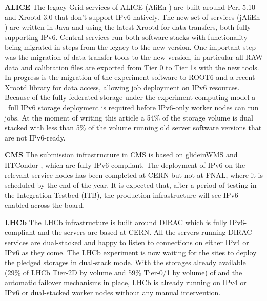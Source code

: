 \textbf{ALICE}
The legacy Grid services of ALICE (AliEn \cite{alien}) are built around Perl 5.10 and Xrootd 3.0 that don’t support IPv6 natively. The new set of services (jAliEn \cite{jalien}) are written in Java and using the latest Xrootd for data transfers, both fully supporting IPv6. Central services run both software stacks with functionality being migrated in steps from the legacy to the new version. One important step was the migration of data transfer tools to the new version, in particular all RAW data and calibration files are exported from Tier 0 to Tier 1s with the new tools. In progress is the migration of the experiment software to ROOT6 and a recent Xrootd library for data access, allowing job deployment on IPv6 resources.
Because of the fully federated storage under the experiment computing model a ~full IPv6 storage deployment is required before IPv6-only worker nodes can run jobs. At the moment of writing this article a 54\% of the storage volume is dual stacked with less than 5\% of the volume running old server software versions that are not IPv6-ready.



\textbf{CMS}
The submission infrastructure in CMS is based on glideinWMS \cite{glideinwms} and HTCondor \cite{htcondor}, which are fully IPv6-compliant. The deployment of IPv6 on the relevant service nodes has been completed at CERN but not at FNAL, where it is scheduled by the end of the year. It is expected that, after a period of testing in the Integration Testbed (ITB), the production infrastructure will see IPv6 enabled across the board.

\textbf{LHCb}
The LHCb infrastructure is built around DIRAC \cite{dirac} which is fully IPv6-compliant and the servers are based at CERN. All the servers running DIRAC services are dual-stacked and happy to listen to connections on either IPv4 or IPv6 as they come. The LHCb experiment is now waiting for the sites to deploy the pledged storages in dual-stack mode. With the storages already available (29\% of LHCb Tier-2D by volume and 59\% Tier-0/1 by volume) of  and the automatic failover mechanisms in place, LHCb is already running on IPv4 or IPv6 or dual-stacked worker nodes without any manual intervention.
